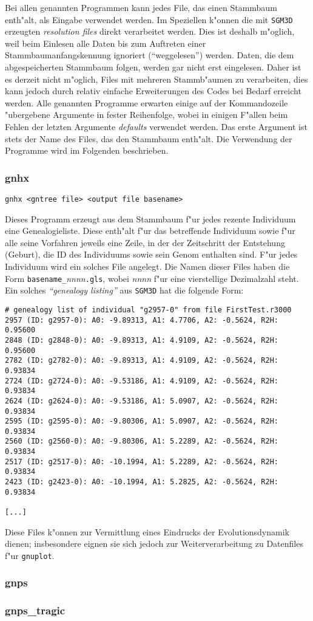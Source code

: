 \documentclass[a4paper, fleqn]{article}
\begin{document}
Bei allen genannten Programmen kann jedes File, das einen Stammbaum enth"alt,
als Eingabe verwendet werden. Im Speziellen k"onnen die mit \verb|SGM3D| erzeugten
\textsl{resolution files} direkt verarbeitet werden. Dies ist deshalb m"oglich,
weil beim Einlesen alle Daten bis zum Auftreten einer Stammbaumanfangskennung
ignoriert ("`weggelesen"') werden. Daten, die dem abgespeicherten Stammbaum
folgen, werden gar nicht erst eingelesen. Daher ist es derzeit nicht m"oglich,
Files mit mehreren Stammb"aumen zu verarbeiten, dies kann jedoch durch relativ
einfache Erweiterungen des Codes bei Bedarf erreicht werden. Alle genannten
Programme erwarten einige auf der Kommandozeile "ubergebene Argumente in fester
Reihenfolge, wobei in einigen F"allen beim Fehlen der letzten Argumente \textsl{defaults}
verwendet werden. Das erste Argument ist stets der Name des Files, das den
Stammbaum enth"alt. Die Verwendung der Programme wird im Folgenden beschrieben.


\subsubsection{gnhx}
\label{gnhx}

\begin{verbatim}
gnhx <gntree file> <output file basename>
\end{verbatim}

Dieses Programm erzeugt aus dem Stammbaum f"ur jedes rezente Individuum eine
Genealogieliste. Diese enth"alt f"ur das betreffende Individuum sowie f"ur alle
seine Vorfahren jeweils eine Zeile, in der der Zeitschritt der Entstehung (Geburt),
die ID des Individuums sowie sein Genom enthalten sind. F"ur jedes Individuum wird
ein solches File angelegt. Die Namen dieser Files haben die Form
\verb|basename_|\textsl{nnnn}\verb|.gls|, wobei \textsl{nnnn} f"ur eine
vierstellige Dezimalzahl steht. Ein solches \textsl{"`genealogy listing"'}
aus \verb|SGM3D| hat die folgende Form:

\begin{verbatim}
# genealogy list of individual "g2957-0" from file FirstTest.r3000
2957 (ID: g2957-0): A0: -9.89313, A1: 4.7706, A2: -0.5624, R2H: 0.95600
2848 (ID: g2848-0): A0: -9.89313, A1: 4.9109, A2: -0.5624, R2H: 0.95600
2782 (ID: g2782-0): A0: -9.89313, A1: 4.9109, A2: -0.5624, R2H: 0.93834
2724 (ID: g2724-0): A0: -9.53186, A1: 4.9109, A2: -0.5624, R2H: 0.93834
2624 (ID: g2624-0): A0: -9.53186, A1: 5.0907, A2: -0.5624, R2H: 0.93834
2595 (ID: g2595-0): A0: -9.80306, A1: 5.0907, A2: -0.5624, R2H: 0.93834
2560 (ID: g2560-0): A0: -9.80306, A1: 5.2289, A2: -0.5624, R2H: 0.93834
2517 (ID: g2517-0): A0: -10.1994, A1: 5.2289, A2: -0.5624, R2H: 0.93834
2423 (ID: g2423-0): A0: -10.1994, A1: 5.2825, A2: -0.5624, R2H: 0.93834

[...]

\end{verbatim}

Diese Files k"onnen zur Vermittlung eines Eindrucks der Evolutionsdynamik dienen;
insbesondere eignen sie sich jedoch zur Weiterverarbeitung zu Datenfiles f"ur
\verb|gnuplot|.


\subsubsection{gnps}
\label{gnps}


\subsubsection{gnps\_tragic}
\label{gnps_tragic}
\end{document}
